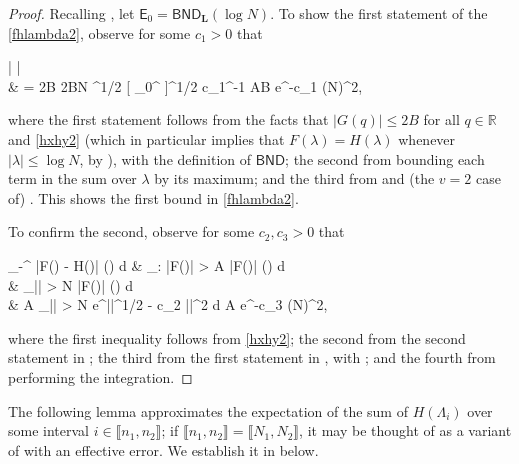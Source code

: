 \documentclass{amsart}
\numberwithin{equation}{section}
\DeclareMathOperator{\eig}{eig}
\theoremstyle{remark}
\theoremstyle{definition}
\begin{document}
	\begin{proof} 
		
		Recalling , let $\mathsf{E}_0 = \mathsf{BND}_{\bm{L}} (\log N)$. To show the first statement of the \eqref{fhlambda2}, observe for some $c_1>0$ that
		\begin{flalign*}
			\Bigg|   \bigg[ & \displaystyle\sum_{i=N_1}^{N_2} \big( F(\Lambda_i) - H(\Lambda_i) \big) \cdot G(q_i - q_j) \bigg] \Bigg| \\ 
			& = 2B \cdot {} \Bigg[ \displaystyle\sum_{i=1}^N | F(\lambda_i) | \cdot \mathbbm{1}_{\mathsf{E}_0^{\complement}} \Bigg] \le 2BN \cdot {} \bigg[ \displaystyle\max_{\lambda \in \eig \bm{L}} | F(\lambda) |^2 \Big]^{1/2} \cdot {} [ _0^{\complement} ]^{1/2} \le c_1^{-1} AB e^{-c_1 (\log N)^2},
		\end{flalign*}
		
		\noindent where the first statement follows from the facts that $| G(q) | \le 2B$ for all $q \in \mathbb{R}$ and \eqref{hxhy2} (which in particular implies that $F(\lambda) = H(\lambda)$ whenever $|\lambda| \le \log N$, by ), with the definition of $\mathsf{BND}$; the second from bounding each term in the sum over $\lambda$ by its maximum; and the third from  and (the $v=2$ case of) . This shows the first bound in \eqref{fhlambda2}. 
		
		To confirm the second, observe for some $c_2, c_3 > 0$ that
		\begin{flalign*}
				\displaystyle\int_{-\infty}^{\infty} |F(\lambda) - H(\lambda)| \varrho (\lambda) d \lambda & \le \displaystyle\int_{\lambda: |F(\lambda)| > A} |F(\lambda)| \varrho (\lambda) d \lambda \\
				&  \le \displaystyle\int_{|\lambda| > \log N} |F(\lambda)| \varrho (\lambda) d \lambda \\
				& \le A \displaystyle\int_{|\lambda| > \log N} e^{|\lambda|^{1/2} - c_2 |\lambda|^2} d \lambda \le A e^{-c_3 (\log N)^2},
		\end{flalign*}
		
		\noindent where the first inequality follows from \eqref{hxhy2}; the second from the second statement in ; the third from the first statement in , with ; and the fourth from performing the integration.
	\end{proof} 
	
	
	The following lemma approximates the expectation of the sum of $H(\Lambda_i)$ over some interval $i \in \llbracket n_1, n_2 \rrbracket$; if $\llbracket n_1, n_2 \rrbracket = \llbracket N_1, N_2 \rrbracket$, it may be thought of as a variant of  with an effective error. We establish it in  below.
	
\end{document}
